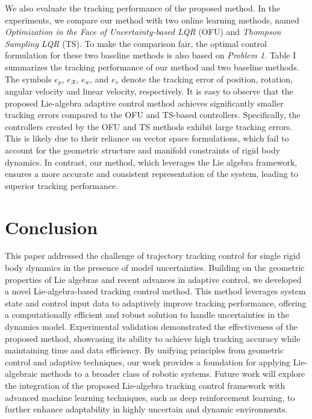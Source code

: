 \documentclass[lettersize,journal]{IEEEtran}
\begin{document}
We also evaluate the tracking performance of the proposed method. In the experiments, we compare our method with two online learning methods, named \textit{Optimization in the Face of Uncertainty-based LQR} (OFU) \cite{dean2018regret} and \textit{Thompson Sampling LQR} (TS)\cite{abeille2017thompson}. To make the comparison fair, the optimal control formulation for these two baseline methods is also based on \textit{Problem 1}. Table I summarizes the tracking performance of our method and two baseline methods. The symbols $e_p$, $e_\mathcal{R}$, $e_w$, and $e_v$ denote the tracking error of position, rotation, angular velocity and linear velocity, respectively. It is easy to observe that the proposed Lie-algebra adaptive control method achieves significantly smaller tracking errors compared to the OFU and TS-based controllers. Specifically, the controllers created by the OFU and TS methods exhibit large tracking errors. This is likely due to their reliance on vector space formulations, which fail to account for the geometric structure and manifold constraints of rigid body dynamics. In contrast, our method, which leverages the Lie algebra framework, ensures a more accurate and consistent representation of the system, leading to superior tracking performance.
\section{Conclusion}
This paper addressed the challenge of trajectory tracking control for single rigid body dynamics in the presence of model uncertainties. Building on the geometric properties of Lie algebras and recent advances in adaptive control, we developed a novel Lie-algebra-based tracking control method. This method leverages system state and control input data to adaptively improve tracking performance, offering a computationally efficient and robust solution to handle uncertainties in the dynamics model. Experimental validation demonstrated the effectiveness of the proposed method, showcasing its ability to achieve high tracking accuracy while maintaining time and data efficiency. By unifying principles from geometric control and adaptive techniques, our work provides a foundation for applying Lie-algebraic methods to a broader class of robotic systems. Future work will explore the integration of the proposed Lie-algebra tracking control framework with advanced machine learning techniques, such as deep reinforcement learning, to further enhance adaptability in highly uncertain and dynamic environments. 
\end{document}

